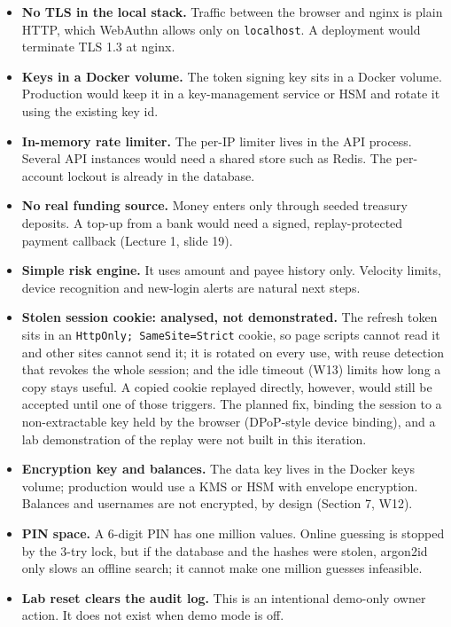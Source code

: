 \documentclass[11pt,a4paper]{article}
\newcommand{\code}[1]{\texttt{#1}}
\begin{document}
\begin{itemize}
\item \textbf{No TLS in the local stack.} Traffic between the browser and nginx is plain HTTP, which WebAuthn allows only on \code{localhost}. A deployment would terminate TLS 1.3 at nginx.
\item \textbf{Keys in a Docker volume.} The token signing key sits in a Docker volume. Production would keep it in a key-management service or HSM and rotate it using the existing key id.
\item \textbf{In-memory rate limiter.} The per-IP limiter lives in the API process. Several API instances would need a shared store such as Redis. The per-account lockout is already in the database.
\item \textbf{No real funding source.} Money enters only through seeded treasury deposits. A top-up from a bank would need a signed, replay-protected payment callback (Lecture 1, slide 19).
\item \textbf{Simple risk engine.} It uses amount and payee history only. Velocity limits, device recognition and new-login alerts are natural next steps.
\item \textbf{Stolen session cookie: analysed, not demonstrated.} The refresh token sits in an \code{HttpOnly; SameSite=Strict} cookie, so page scripts cannot read it and other sites cannot send it; it is rotated on every use, with reuse detection that revokes the whole session; and the idle timeout (W13) limits how long a copy stays useful. A copied cookie replayed directly, however, would still be accepted until one of those triggers. The planned fix, binding the session to a non-extractable key held by the browser (DPoP-style device binding), and a lab demonstration of the replay were not built in this iteration.
\item \textbf{Encryption key and balances.} The data key lives in the Docker keys volume; production would use a KMS or HSM with envelope encryption. Balances and usernames are not encrypted, by design (Section 7, W12).
\item \textbf{PIN space.} A 6-digit PIN has one million values. Online guessing is stopped by the 3-try lock, but if the database and the hashes were stolen, argon2id only slows an offline search; it cannot make one million guesses infeasible.
\item \textbf{Lab reset clears the audit log.} This is an intentional demo-only owner action. It does not exist when demo mode is off.
\end{itemize}
\end{document}
